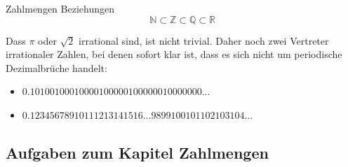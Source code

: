\begin{gesetz}{Zahlmengen Beziehungen}{}
$$\mathbb{N} \subset \mathbb{Z} \subset \mathbb{Q} \subset \mathbb{R} $$
\end{gesetz}


Dass $\pi$ oder $\sqrt{2}$ irrational sind, ist nicht trivial. Daher
noch zwei Vertreter irrationaler Zahlen, bei denen sofort klar ist,
dass es sich nicht um periodische Dezimalbrüche handelt:
\begin{itemize}
\item $0.10 100 100010000100000100000010000000...$
\item $0.12345678910111213141516 ... 9899100101102103104 ... $
\end{itemize}
\newpage


\subsection*{Aufgaben zum Kapitel Zahlmengen}

